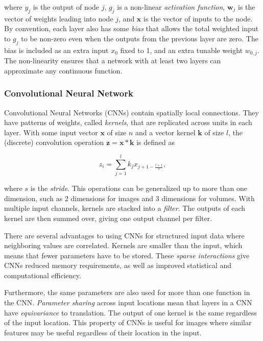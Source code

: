 where \(y_j\) is the output of node \(j\), \(g_j\) is a non-linear \textit{activation function}, \(\mathbf{w}_j\) is the vector of weights leading into node \(j\), and \(\mathbf{x}\) is the vector of inputs to the node.
By convention, each layer also has some \textit{bias} that allows the total weighted input to \(g_j\) to be non-zero even when the outputs from the previous layer are zero.
The bias is included as an extra input \(x_0\) fixed to 1, and an extra tunable weight \(w_{0,j}\).
The non-linearity ensures that a network with at least two layers can approximate any continuous function.~\cite{russell_artificial_2021}

\subsubsection{Convolutional Neural Network}

Convolutional Neural Networks (CNNs) contain spatially local connections.
They have patterns of weights, called \textit{kernels}, that are replicated across units in each layer.
With some input vector \(\mathbf{x}\) of size \(n\) and a vector kernel \(\mathbf{k}\) of size \(l\), the (discrete) convolution operation \(\mathbf{z} = \mathbf{x} \ast \mathbf{k}\) is defined as

\begin{equation}
    z_i = \sum_{j=1}^l k_j x_{j+1-\frac{l+1}{s}},
\end{equation}

where \(s\) is the \textit{stride}.
This operations can be generalized up to more than one dimension, such as 2 dimensions for images and 3 dimensions for volumes.
With multiple input channels, kernels are stacked into a \textit{filter}.
The outputs of each kernel are then summed over, giving one output channel per filter.

There are several advantages to using CNNs for structured input data where neighboring values are correlated.
Kernels are smaller than the input, which means that fewer parameters have to be stored.
These \textit{sparse interactions} give CNNs reduced memory requirements,
as well as improved statistical and computational efficiency.

Furthermore, the same parameters are also used for more than one function in the CNN. \textit{Parameter sharing} across input locations mean that layers in a CNN have \textit{equivariance} to translation. 
The output of one kernel is the same regardless of the input location.
This property of CNNs is useful for images where similar features may be useful regardless of their location in the input.~\cite{goodfellow_deep_2016}

